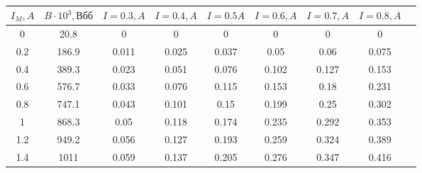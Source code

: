 \begin{table}[h]
    \centering
\begin{tabular}{|c|c|c|c|c|c|c|c|c|}\hline
$I_M, A$ & $B\cdot 10^3, \text{Вб}б$ & $I = 0.3,A$ & $I = 0.4,A$ & $I = 0.5 A$ & $I = 0.6,A$ & $I = 0.7,A$ & $I = 0.8,A$ \\ \hline
0 & 20.8 & 0 & 0 & 0 & 0 & 0 & 0 \\ \hline
0.2 & 186.9 & 0.011 & 0.025 & 0.037 & 0.05 & 0.06 & 0.075 \\ \hline
0.4 & 389.3 & 0.023 & 0.051 & 0.076 & 0.102 & 0.127 & 0.153 \\ \hline
0.6 & 576.7 & 0.033 & 0.076 & 0.115 & 0.153 & 0.18 & 0.231 \\ \hline
0.8 & 747.1 & 0.043 & 0.101 & 0.15 & 0.199 & 0.25 & 0.302 \\ \hline
1 & 868.3 & 0.05 & 0.118 & 0.174 & 0.235 & 0.292 & 0.353 \\ \hline
1.2 & 949.2 & 0.056 & 0.127 & 0.193 & 0.259 & 0.324 & 0.389 \\ \hline
1.4 & 1011 & 0.059 & 0.137 & 0.205 & 0.276 & 0.347 & 0.416 \\ \hline
\end{tabular}\\
 \caption{}
\end{table}








 




